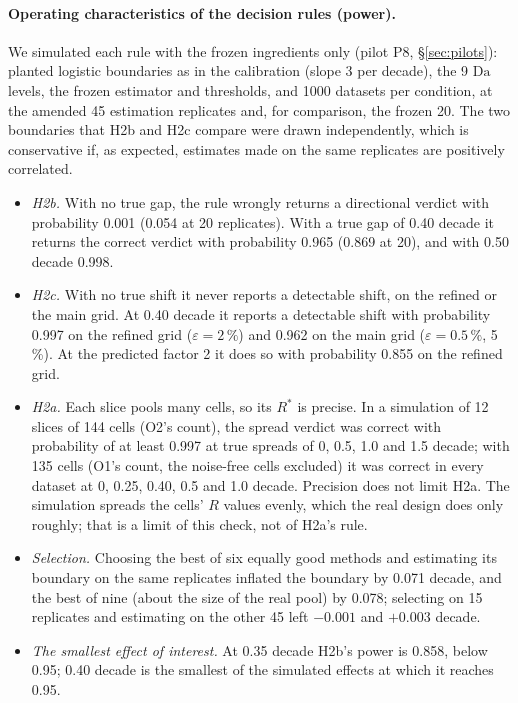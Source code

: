 \documentclass[11pt]{article}
\newcommand{\Da}{\mathrm{Da}}
\begin{document}
\paragraph{Operating characteristics of the decision rules (power).}
We simulated each rule with the frozen ingredients only (pilot P8, \S\ref{sec:pilots}):
planted logistic boundaries as in the calibration (slope 3 per decade), the 9 $\Da$ levels,
the frozen estimator and thresholds, and 1000 datasets per condition, at the amended 45
estimation replicates and, for comparison, the frozen 20. The two boundaries that H2b and
H2c compare were drawn independently, which is conservative if, as expected, estimates made
on the same replicates are positively correlated.
\begin{itemize}
\item \emph{H2b.} With no true gap, the rule wrongly returns a directional verdict with
probability 0.001 (0.054 at 20 replicates). With a true gap of 0.40 decade it returns the
correct verdict with probability 0.965 (0.869 at 20), and with 0.50 decade 0.998.
\item \emph{H2c.} With no true shift it never reports a detectable shift, on the refined or
the main grid. At 0.40 decade it reports a detectable shift with probability 0.997 on the
refined grid ($\varepsilon = 2\,\%$) and 0.962 on the main grid ($\varepsilon = 0.5\,\%$,
5\,\%). At the predicted factor 2 it does so with probability 0.855 on the refined grid.
\item \emph{H2a.} Each slice pools many cells, so its $R^{*}$ is precise. In a simulation of
12 slices of 144 cells (O2's count), the spread verdict was correct with probability of at
least 0.997 at true spreads of 0, 0.5, 1.0 and 1.5 decade; with 135 cells (O1's count, the
noise-free cells excluded) it was correct in every dataset at 0, 0.25, 0.40, 0.5 and 1.0
decade. Precision does not limit H2a. The simulation spreads the cells' $R$ values evenly,
which the real design does only roughly; that is a limit of this check, not of H2a's rule.
\item \emph{Selection.} Choosing the best of six equally good methods and estimating its
boundary on the same replicates inflated the boundary by 0.071 decade, and the best of nine
(about the size of the real pool) by 0.078; selecting on 15 replicates and estimating on the
other 45 left $-0.001$ and $+0.003$ decade.
\item \emph{The smallest effect of interest.} At 0.35 decade H2b's power is 0.858, below 0.95;
0.40 decade is the smallest of the simulated effects at which it reaches 0.95.
\end{itemize}
\end{document}
